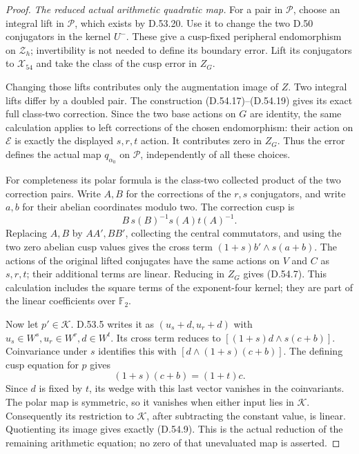 \begin{proof}
\emph{The reduced actual arithmetic quadratic map.}
For a pair in \(\mathcal P\), choose
an integral lift in \(\mathscr P\),
which exists by D.53.20.
Use it to change the two D.50
conjugators in the kernel \(U^-\).
These give a cusp-fixed peripheral
endomorphism on \(\mathcal Z_h\);
invertibility is not needed to
define its boundary error.
Lift its conjugators to
\(\mathcal X_{54}\) and take the
class of the cusp error in \(Z_G\).

Changing those lifts contributes
only the augmentation image of \(Z\).
Two integral lifts differ by a
doubled pair. The construction
(D.54.17)--(D.54.19) gives its exact
full class-two correction. Since the
two base actions on \(G\) are identity,
the same calculation applies to
left corrections of the chosen
endomorphism: their action on
\(\mathscr E\) is exactly the
displayed \(s,r,t\) action. It
contributes zero in \(Z_G\).
Thus the error defines the actual
map \(q_{\alpha_0}\) on \(\mathcal P\),
independently of all these choices.

For completeness its polar formula
is the class-two collected product
of the two correction pairs.
Write \(A,B\) for the corrections
of the \(r,s\) conjugators, and
write \(a,b\) for their abelian
coordinates modulo two.
The correction cusp is
\[
                 B\,s(B)^{-1}s(A)t(A)^{-1}.
 \tag{D.54.20}
\]
Replacing \(A,B\) by \(AA',BB'\),
collecting the central commutators,
and using the two zero abelian
cusp values gives the cross term
\((1+s)b'\wedge s(a+b)\).
The actions of the original lifted
conjugates have the same actions
on \(V\) and \(C\) as \(s,r,t\);
their additional terms are linear.
Reducing in \(Z_G\) gives (D.54.7).
This calculation includes the
square terms of the exponent-four
kernel; they are part of the
linear coefficients over \(\mathbb F_2\).

Now let \(p'\in\mathcal K\).
D.53.5 writes it as
\((u_s+d,u_r+d)\) with
\(u_s\in W^s,u_r\in W^r,d\in W^t\).
Its cross term reduces to
\([(1+s)d\wedge s(c+b)]\).
Coinvariance under \(s\) identifies
this with \([d\wedge(1+s)(c+b)]\).
The defining cusp equation for \(p\)
gives
\[
                 (1+s)(c+b)=(1+t)c .
 \tag{D.54.21}
\]
Since \(d\) is fixed by \(t\), its
wedge with this last vector vanishes
in the coinvariants. The polar map
is symmetric, so it vanishes when
either input lies in \(\mathcal K\).
Consequently its restriction to
\(\mathcal K\), after subtracting
the constant value, is linear.
Quotienting its image gives exactly
(D.54.9). This is the actual reduction
of the remaining arithmetic equation;
no zero of that unevaluated map is
asserted.


\end{proof}

